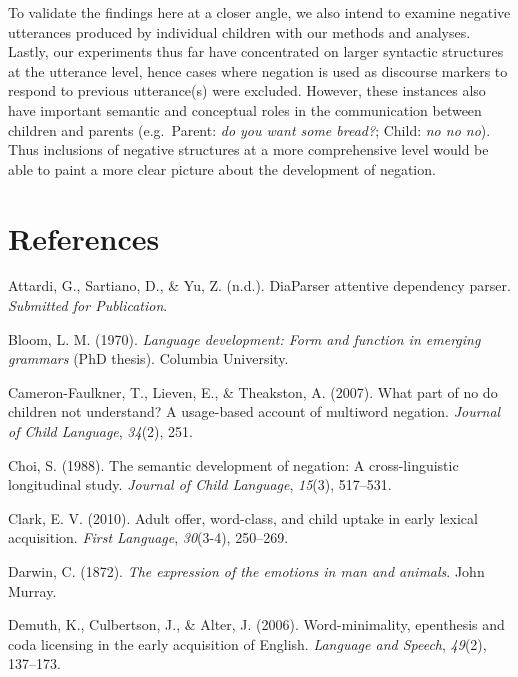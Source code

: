 \documentclass[10pt, letterpaper]{article}
\begin{document}
To validate the findings here at a closer angle, we also intend to
examine negative utterances produced by individual children with our
methods and analyses. Lastly, our experiments thus far have concentrated
on larger syntactic structures at the utterance level, hence cases where
negation is used as discourse markers to respond to previous
utterance(s) were excluded. However, these instances also have important
semantic and conceptual roles in the communication between children and
parents (e.g.~Parent: \emph{do you want some bread?}; Child: \emph{no no
no}). Thus inclusions of negative structures at a more comprehensive
level would be able to paint a more clear picture about the development
of negation.

\hypertarget{references}{%
\section{References}\label{references}}

\setlength{\parindent}{-0.1in} 
\setlength{\leftskip}{0.125in}

\noindent

\hypertarget{refs}{}
\leavevmode\hypertarget{ref-diaparser}{}%
Attardi, G., Sartiano, D., \& Yu, Z. (n.d.). DiaParser attentive
dependency parser. \emph{Submitted for Publication}.

\leavevmode\hypertarget{ref-bloom1970language}{}%
Bloom, L. M. (1970). \emph{Language development: Form and function in
emerging grammars} (PhD thesis). Columbia University.

\leavevmode\hypertarget{ref-cameron2007part}{}%
Cameron-Faulkner, T., Lieven, E., \& Theakston, A. (2007). What part of
no do children not understand? A usage-based account of multiword
negation. \emph{Journal of Child Language}, \emph{34}(2), 251.

\leavevmode\hypertarget{ref-choi1988semantic}{}%
Choi, S. (1988). The semantic development of negation: A
cross-linguistic longitudinal study. \emph{Journal of Child Language},
\emph{15}(3), 517--531.

\leavevmode\hypertarget{ref-clark2010adult}{}%
Clark, E. V. (2010). Adult offer, word-class, and child uptake in early
lexical acquisition. \emph{First Language}, \emph{30}(3-4), 250--269.

\leavevmode\hypertarget{ref-darwin1872expression}{}%
Darwin, C. (1872). \emph{The expression of the emotions in man and
animals}. John Murray.

\leavevmode\hypertarget{ref-demuth2006word}{}%
Demuth, K., Culbertson, J., \& Alter, J. (2006). Word-minimality,
epenthesis and coda licensing in the early acquisition of English.
\emph{Language and Speech}, \emph{49}(2), 137--173.
\end{document}
